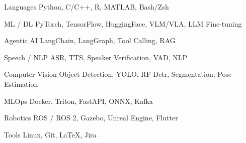 






\begin{cvskills}

\cvskill
{Languages}
{Python, C/C++, R, MATLAB, Bash/Zsh}

\cvskill
{ML / DL}
{PyTorch, TensorFlow, HuggingFace, VLM/VLA, LLM Fine-tuning}

\cvskill
{Agentic AI}
{LangChain, LangGraph, Tool Calling, RAG}

\cvskill
{Speech / NLP}
{ASR, TTS, Speaker Verification, VAD, NLP}

\cvskill
{Computer Vision}
{Object Detection, YOLO, RF-Detr, Segmentation, Pose Estimation}

\cvskill
{MLOps}
{Docker, Triton, FastAPI, ONNX, Kafka}

\cvskill
{Robotics}
{ROS / ROS 2, Gazebo, Unreal Engine, Flutter}

\cvskill
{Tools}
{Linux, Git, \LaTeX, Jira}

\end{cvskills}